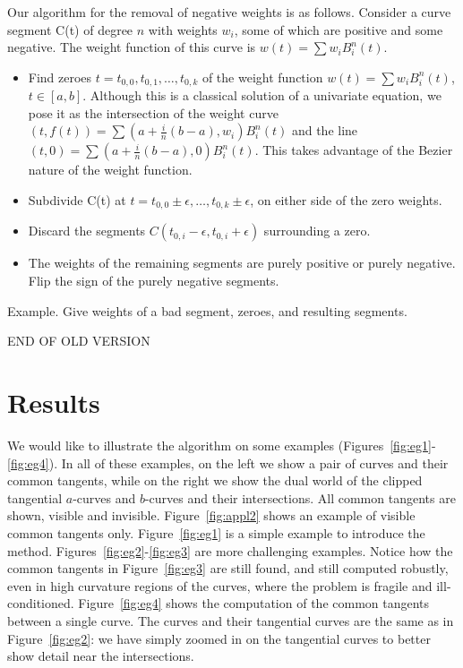 \documentclass[10pt,twocolumn]{article}
\begin{document}
{Our algorithm for the removal of negative weights is as follows.
Consider a curve segment C(t) of degree $n$ with weights $w_i$,
some of which are positive and some negative.
The weight function of this curve is $w(t) = \sum w_i B_i^n(t)$.
%
\begin{itemize}
\item Find zeroes $t = t_{0,0},t_{0,1},\ldots,t_{0,k}$ of the weight function
	$w(t) = \sum w_i B_i^n(t)$, $t \in [a,b]$.
	Although this is a classical solution of a univariate equation,
	we pose it as the intersection of the weight curve 
	$(t,f(t)) = \sum (a + \frac{i}{n} (b-a), w_i) B_i^n(t)$
	and the line $(t,0) = \sum (a + \frac{i}{n} (b-a), 0)B_i^n(t)$.
	This takes advantage of the Bezier nature of the weight function.
%
\item Subdivide C(t) at $t = t_{0,0} \pm \epsilon,\ldots,t_{0,k} \pm \epsilon$,
	on either side of the zero weights.
\item Discard the segments $C(t_{0,i}-\epsilon,t_{0,i}+\epsilon)$
	surrounding a zero.
\item The weights of the remaining segments are purely positive or
	purely negative.  Flip the sign of the purely negative segments.
\end{itemize}

\begin{example}
Example.
Give weights of a bad segment, zeroes, and resulting segments.
\end{example}
END OF OLD VERSION
}

\section{Results}
\label{sec:results}

We would like to illustrate the algorithm on some examples 
(Figures~\ref{fig:eg1}-\ref{fig:eg4}).
In all of these examples, on the left we show a pair of curves 
and their common tangents,
while on the right we show the dual world of 
the clipped tangential $a$-curves and $b$-curves and their intersections.
All common tangents are shown, visible and invisible.
Figure~\ref{fig:appl2} shows an example of visible common tangents only.
Figure~\ref{fig:eg1} is a simple example to introduce the method.
Figures~\ref{fig:eg2}-\ref{fig:eg3} are more challenging examples.
Notice how the common tangents in Figure~\ref{fig:eg3} are still found,
and still computed robustly, even in high curvature regions of the
curves, where the problem is fragile and ill-conditioned.
Figure~\ref{fig:eg4} shows the computation of the common tangents
between a single curve.
The curves and their tangential curves are the same as in Figure~\ref{fig:eg2}:
we have simply zoomed in on the tangential curves to better show detail
near the intersections.
\end{document}
